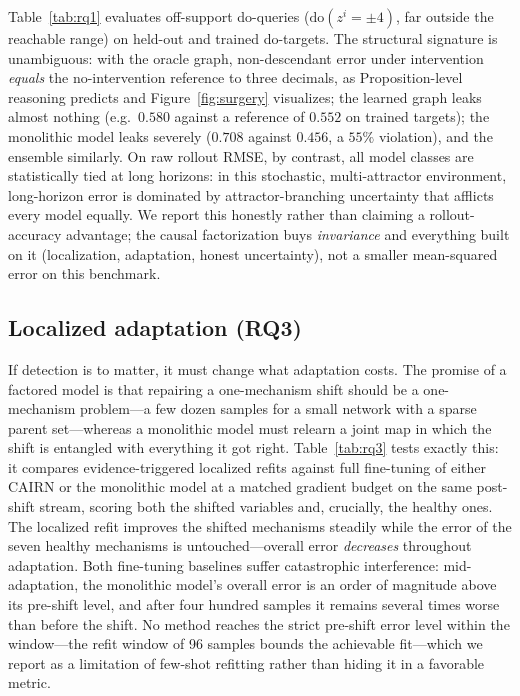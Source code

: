 \documentclass[preprint,12pt]{elsarticle}
\theoremstyle{definition}
\theoremstyle{remark}
\newcommand{\dt}{\mathrm{do}}
\begin{document}
Table~\ref{tab:rq1} evaluates off-support do-queries
($\dt(z^i{=}\pm4)$, far outside the reachable range) on held-out and
trained do-targets. The structural signature is unambiguous: with the
oracle graph, non-descendant error under intervention \emph{equals} the
no-intervention reference to three decimals, as
Proposition-level reasoning predicts and Figure~\ref{fig:surgery}
visualizes; the learned graph leaks almost nothing (e.g.\ $0.580$ against
a reference of $0.552$ on trained targets); the monolithic model leaks
severely ($0.708$ against $0.456$, a $55\%$ violation), and the ensemble
similarly. On raw rollout RMSE, by contrast, all model classes are
statistically tied at long horizons: in this stochastic, multi-attractor
environment, long-horizon error is dominated by attractor-branching
uncertainty that afflicts every model equally. We report this honestly
rather than claiming a rollout-accuracy advantage; the causal
factorization buys \emph{invariance} and everything built on it
(localization, adaptation, honest uncertainty), not a smaller
mean-squared error on this benchmark.



\subsection{Localized adaptation (RQ3)}

If detection is to matter, it must change what adaptation costs. The
promise of a factored model is that repairing a one-mechanism shift
should be a one-mechanism problem---a few dozen samples for a small
network with a sparse parent set---whereas a monolithic model must
relearn a joint map in which the shift is entangled with everything it
got right. Table~\ref{tab:rq3} tests exactly this: it compares
evidence-triggered localized refits against full fine-tuning of either
CAIRN or the monolithic model at a matched gradient budget on the same
post-shift stream, scoring both the shifted variables and, crucially,
the healthy ones. The localized refit
improves the shifted mechanisms steadily while the error of the seven
healthy mechanisms is untouched---overall error \emph{decreases}
throughout adaptation. Both fine-tuning baselines suffer catastrophic
interference: mid-adaptation, the monolithic model's overall error is
an order of magnitude above its pre-shift level, and after four hundred
samples it remains several times worse than before the shift. No method
reaches the strict pre-shift error level within the window---the refit
window of 96 samples bounds the achievable fit---which we report as a
limitation of few-shot refitting rather than hiding it in a favorable
metric.
\end{document}

